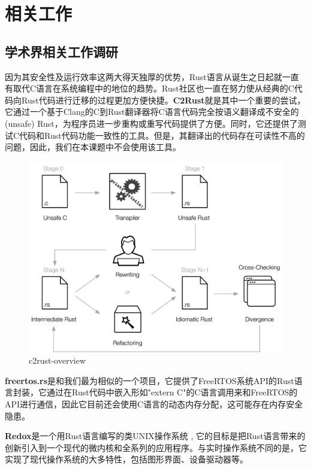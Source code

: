 \documentclass[12pt, a4paper]{article}
\begin{document}
	\section{相关工作}
	\subsection{学术界相关工作调研}
	因为其安全性及运行效率这两大得天独厚的优势，Rust语言从诞生之日起就一直有取代C语言在系统编程中的地位的趋势。Rust社区也一直在努力使从经典的C代码向Rust代码进行迁移的过程更加方便快捷。\textbf{C2Rust}就是其中一个重要的尝试，它通过一个基于Clang的C到Rust翻译器将C语言代码完全按语义翻译成不安全的(unsafe) Rust，为程序员进一步重构或重写代码提供了方便。同时，它还提供了测试C代码和Rust代码功能一致性的工具。但是，其翻译出的代码存在可读性不高的问题，因此，我们在本课题中不会使用该工具。
	
\begin{figure}[H]
	\centering
	\includegraphics[width=1.0\linewidth]{c2rust-overview}
	\caption{c2rust-overview}
	\label{fig:c2rust-overview}
\end{figure}
	
	\textbf{freertos.rs}是和我们最为相似的一个项目，它提供了FreeRTOS系统API的Rust语言封装，它通过在Rust代码中嵌入形如"extern C"的C语言调用来和FreeRTOS的API进行通信，因此它目前还会使用C语言的动态内存分配，这可能存在内存安全隐患。
	
	\textbf{Redox}是一个用Rust语言编写的类UNIX操作系统 , 它的目标是把Rust语言带来的创新引入到一个现代的微内核和全系列的应用程序。与实时操作系统不同的是，它实现了现代操作系统的大多特性，包括图形界面、设备驱动器等。
	
\end{document}
